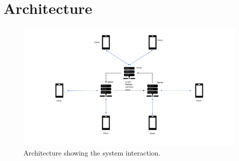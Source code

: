 \documentclass[runningheads]{llncs}
\begin{document}
\section{Architecture}

\begin{figure}
\includegraphics[width=\textwidth]{images/Architecture.png}
\caption{Architecture showing the system interaction.} \label{fig1}
\end{figure}



%
%
%
% 
% 
%
\end{document}

